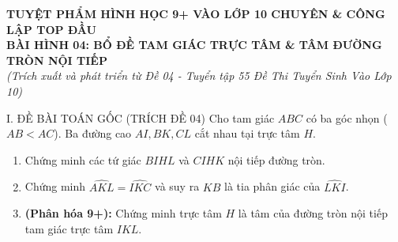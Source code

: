 \documentclass[11pt,a4paper]{article}
\begin{document}
\begin{center}
    {\Large\bfseries\color{blue!80!black} TUYỆT PHẨM HÌNH HỌC 9+ VÀO LỚP 10 CHUYÊN \& CÔNG LẬP TOP ĐẦU}\\[2mm]
    {\large\bfseries BÀI HÌNH 04: BỔ ĐỀ TAM GIÁC TRỰC TÂM \& TÂM ĐƯỜNG TRÒN NỘI TIẾP}\\[1mm]
    \textit{(Trích xuất và phát triển từ Đề 04 - Tuyển tập 55 Đề Thi Tuyển Sinh Vào Lớp 10)}
\end{center}

\vspace{1mm}

\begin{modelbox}{I. ĐỀ BÀI TOÁN GỐC (TRÍCH ĐỀ 04)}
Cho tam giác $ABC$ có ba góc nhọn ($AB < AC$). Ba đường cao $AI, BK, CL$ cắt nhau tại trực tâm $H$.
\begin{enumerate}[label=\textbf{\alph*)}]
    \item Chứng minh các tứ giác $BIHL$ và $CIHK$ nội tiếp đường tròn.
    \item Chứng minh $\widehat{AKL} = \widehat{IKC}$ và suy ra $KB$ là tia phân giác của $\widehat{LKI}$.
    \item \textbf{(Phân hóa 9+):} Chứng minh trực tâm $H$ là tâm của đường tròn nội tiếp tam giác trực tâm $IKL$.
\end{enumerate}
\end{modelbox}

\vspace{1mm}
\end{document}

